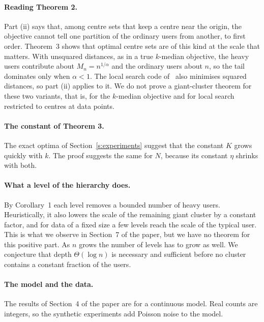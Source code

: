 \documentclass[11pt]{article}
\theoremstyle{remark}\newtheorem{remark}{Remark}\renewcommand{\theremark}{S\arabic{remark}}
\begin{document}
\paragraph{Reading Theorem 2.} Part (ii) says that, among centre sets that keep a centre near the origin, the objective cannot tell one partition of the ordinary users from another, to first order. Theorem~3 shows that optimal centre sets are of this kind at the scale that matters. With unsquared distances, as in a true $k$-median objective, the heavy users contribute about $M_n=n^{1/\alpha}$ and the ordinary users about $n$, so the tail dominates only when $\alpha<1$. The local search code of~\cite{ocallaghan2002streaming} also minimises squared distances, so part (ii) applies to it. We do not prove a giant-cluster theorem for these two variants, that is, for the $k$-median objective and for local search restricted to centres at data points.

\paragraph{The constant of Theorem 3.} The exact optima of Section~\ref{s:experiments} suggest that the constant $K$ grows quickly with $k$. The proof suggests the same for $N$, because its constant $\eta$ shrinks with both.

\paragraph{What a level of the hierarchy does.} By Corollary~1 each level removes a bounded number of heavy users. Heuristically, it also lowers the scale of the remaining giant cluster by a constant factor, and for data of a fixed size a few levels reach the scale of the typical user. This is what we observe in Section~7 of the paper, but we have no theorem for this positive part. As $n$ grows the number of levels has to grow as well. We conjecture that depth $\Theta(\log n)$ is necessary and sufficient before no cluster contains a constant fraction of the users.

\paragraph{The model and the data.} The results of Section~4 of the paper are for a continuous model. Real counts are integers, so the synthetic experiments add Poisson noise to the model.
\end{document}
